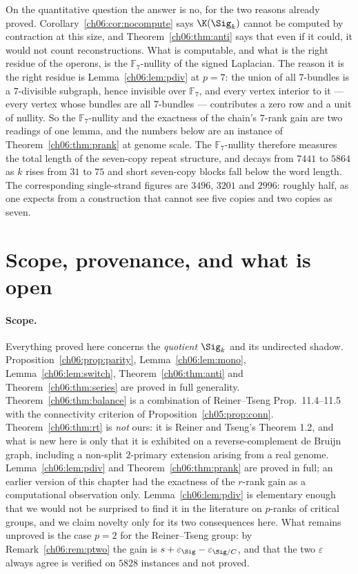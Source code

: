 On the quantitative question the answer is no, for the two reasons already proved.
Corollary~\ref{ch06:cor:nocompute} says $\K(\Sig_k)$ cannot be computed by contraction at this
size, and Theorem~\ref{ch06:thm:anti} says that even if it could, it would not count
reconstructions. What is computable, and what is the right residue of the operons, is the
$\mathbb{F}_7$-nullity of the signed Laplacian. The reason it is the right residue is
Lemma~\ref{ch06:lem:pdiv} at $p=7$: the union of all $7$-bundles is a $7$-divisible subgraph,
hence invisible over $\mathbb{F}_7$, and every vertex interior to it --- every vertex whose
bundles are all $7$-bundles --- contributes a zero row and a unit of nullity. So the
$\mathbb{F}_7$-nullity and the exactness of the chain's $7$-rank gain are two readings of one
lemma, and the numbers below are an instance of Theorem~\ref{ch06:thm:prank} at genome scale.
The $\mathbb{F}_7$-nullity therefore measures the
total length of the seven-copy repeat structure, and decays from $7441$ to $5864$ as $k$
rises from $31$ to $75$ and short seven-copy blocks fall below the word length. The
corresponding single-strand figures are $3496$, $3201$ and $2996$: roughly half, as one
expects from a construction that cannot see five copies and two copies as seven.

\section{Scope, provenance, and what is open}

\paragraph{Scope.} Everything proved here concerns the \emph{quotient} $\Sig_k$ and its
undirected shadow. Proposition~\ref{ch06:prop:parity}, Lemma~\ref{ch06:lem:mono},
Lemma~\ref{ch06:lem:switch}, Theorem~\ref{ch06:thm:anti} and Theorem~\ref{ch06:thm:series} are proved in
full generality. Theorem~\ref{ch06:thm:balance} is a combination of Reiner--Tseng
Prop.~11.4--11.5 with the connectivity criterion of Proposition~\ref{ch05:prop:conn}. Theorem~\ref{ch06:thm:rt}
is \emph{not} ours: it is Reiner and Tseng's Theorem 1.2, and what is new here is only that
it is exhibited on a reverse-complement de Bruijn graph, including a non-split $2$-primary
extension arising from a real genome. Lemma~\ref{ch06:lem:pdiv} and Theorem~\ref{ch06:thm:prank} are
proved in full; an earlier version of this chapter had the exactness of the $r$-rank gain as a
computational observation only. Lemma~\ref{ch06:lem:pdiv} is elementary enough that we would not
be surprised to find it in the literature on $p$-ranks of critical groups, and we claim
novelty only for its two consequences here. What remains unproved is the case $p=2$ for the
Reiner--Tseng group: by Remark~\ref{ch06:rem:ptwo} the gain is $s+\varepsilon_\Sig-
\varepsilon_{\Sig/C}$, and that the two $\varepsilon$ always agree is verified on $5828$
instances and not proved.

